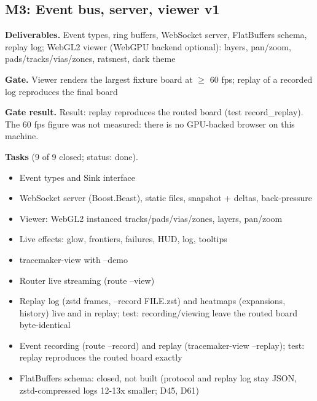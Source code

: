\subsection*{M3: Event bus, server, viewer v1}
\noindent\textbf{Deliverables.} Event types, ring buffers, WebSocket server, FlatBuffers schema, replay log; WebGL2 viewer (WebGPU backend optional): layers, pan/zoom, pads/tracks/vias/zones, ratsnest, dark theme\par\smallskip
\noindent\textbf{Gate.} Viewer renders the largest fixture board at $\geq$ 60 fps; replay of a recorded log reproduces the final board\par\smallskip
\noindent\colorbox{boxfill}{\parbox{\dimexpr\linewidth-2\fboxsep}{\textbf{Gate result.} Result: replay reproduces the routed board (test record\_replay). The 60 fps figure was not measured: there is no GPU-backed browser on this machine.}}\par\smallskip
\noindent\textbf{Tasks} (9 of 9 closed; status: done).
\begin{itemize}[leftmargin=1.6em,itemsep=1pt]
\item[\textcolor{fraqua}{$\checkmark$}] Event types and Sink interface
\item[\textcolor{fraqua}{$\checkmark$}] WebSocket server (Boost.Beast), static files, snapshot + deltas, back-pressure
\item[\textcolor{fraqua}{$\checkmark$}] Viewer: WebGL2 instanced tracks/pads/vias/zones, layers, pan/zoom
\item[\textcolor{fraqua}{$\checkmark$}] Live effects: glow, frontiers, failures, HUD, log, tooltips
\item[\textcolor{fraqua}{$\checkmark$}] tracemaker-view with --demo
\item[\textcolor{fraqua}{$\checkmark$}] Router live streaming (route --view)
\item[\textcolor{fraqua}{$\checkmark$}] Replay log (zstd frames, --record FILE.zst) and heatmaps (expansions, history) live and in replay; test: recording/viewing leave the routed board byte-identical
\item[\textcolor{fraqua}{$\checkmark$}] Event recording (route --record) and replay (tracemaker-view --replay); test: replay reproduces the routed board exactly
\item[\textcolor{fraqua}{$\checkmark$}] FlatBuffers schema: closed, not built (protocol and replay log stay JSON, zstd-compressed logs 12-13x smaller; D45, D61)
\end{itemize}
